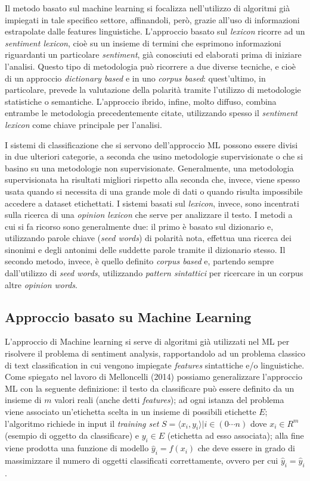 \documentclass[a4paper,12pt,openright,twoside]{report}
\theoremstyle{definition}
\begin{document}
Il metodo basato sul machine learning si focalizza nell'utilizzo di algoritmi
già impiegati in tale specifico settore, affinandoli, però, grazie all'uso 
di informazioni estrapolate dalle features linguistiche.
L'approccio basato sul \emph{lexicon} ricorre ad un \emph{sentiment lexicon},
cioè su un insieme di termini che esprimono informazioni riguardanti un particolare
\emph{sentiment}, già conosciuti ed elaborati prima di iniziare l'analisi.
Questo tipo di metodologia può ricorrere a due diverse tecniche,
e cioè di 
un approccio \emph{dictionary based} e in uno \emph{corpus based}:
quest'ultimo, in particolare, prevede la valutazione della polarità
tramite l'utilizzo di metodologie statistiche o
semantiche.
L'approccio ibrido, infine, molto diffuso, combina entrambe le metodologia precedentemente
citate, utilizzando spesso il \emph{sentiment lexicon} come chiave principale per l'analisi.

I sistemi di classificazione che  si servono dell'approccio ML possono essere 
divisi in due ulteriori categorie, a seconda che usino metodologie supervisionate
o che si basino su una metodologie non supervisionate. Generalmente, una metodologia
supervisionata ha risultati migliori rispetto alla seconda che, invece,
viene spesso usata quando si necessita di una grande mole di dati o quando risulta
impossibile accedere a dataset etichettati.
I sistemi basati sul \emph{lexicon}, invece, sono incentrati sulla ricerca di una \emph{opinion lexicon}
che serve per analizzare il testo. I metodi a cui si fa ricorso sono generalmente due:
il primo è basato sul dizionario e, utilizzando parole chiave (\emph{seed words}) di polarità nota,
effettua una ricerca dei sinonimi e degli antonimi delle suddette parole tramite il dizionario stesso.
Il secondo metodo, invece, è quello definito \emph{corpus based} e, partendo sempre dall'utilizzo di
\emph{seed words}, utilizzando \emph{pattern sintattici} per 
ricercare in un corpus altre \emph{opinion words}.
\subsection{Approccio basato su Machine Learning}
L'approccio di Machine learning si serve di algoritmi già utilizzati nel ML per risolvere il problema
di sentiment analysis, rapportandolo ad un problema classico di text classification 
in cui vengono impiegate
\emph{features} sintattiche e/o linguistiche.
Come spiegato nel lavoro di Melloncelli (2014) %
possiamo generalizzare l'approccio ML con la seguente
definizione: il testo da classificare può essere definito da un insieme
di $m$ valori reali (anche detti \emph{features}); ad ogni istanza del problema viene associato
un'etichetta scelta in un insieme di possibili etichette $E$; l’algoritmo richiede in input il
\emph{training set} $S = {\langle x_i , y_i\rangle | i \in (0 \cdots n)}$ dove $x_i \in R^m$
(esempio di oggetto da classificare)
e $y_i \in E$ (etichetta ad esso associata); alla fine viene prodotta una funzione di modello 
$\hat{y}_i = f(x_i)$ che deve essere in grado di massimizzare il numero di oggetti classificati
correttamente, ovvero per cui $\hat{y}_i = \hat{y}_i$.
\end{document}
